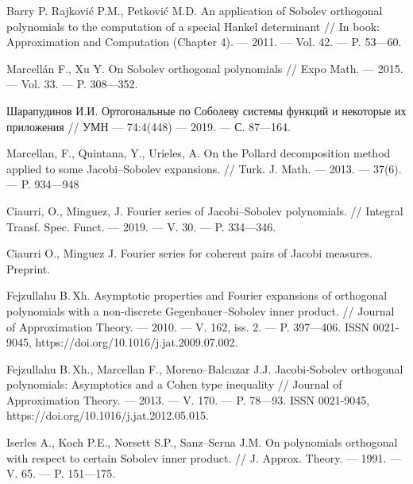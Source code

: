 ﻿\begin{thebibliography}{99}
{Barry P. Rajkovi\'c P.M., Petkovi\'c M.D.}
An application of Sobolev orthogonal polynomials to the computation of a special Hankel determinant
//
In book: Approximation and Computation (Chapter 4).
--- 2011.
--- Vol. 42.
--- P. 53---60.




{Marcell\'an F., Xu Y.}
On Sobolev orthogonal polynomials
//
Expo Math.
--- 2015.
--- Vol. 33.
--- P. 308---352.




Шарапудинов И.И.
Ортогональные по Соболеву системы функций и некоторые их приложения
//
УМН
--- 74:4(448)
--- 2019.
--- С. 87---164.




Marcellan, F., Quintana, Y., Urieles, A.
On the Pollard decomposition method applied to some Jacobi--Sobolev expansions.
//
Turk. J. Math.
--- 2013.
--- 37(6).
--- P. 934---948




Ciaurri, O., Minguez, J.
Fourier series of Jacobi--Sobolev polynomials.
//
Integral Transf. Spec. Funct.
--- 2019.
--- V. 30.
--- P. 334---346.




Ciaurri O., Minguez J.
Fourier series for coherent pairs of Jacobi measures. Preprint.




Fejzullahu B.\,Xh.
Asymptotic properties and Fourier expansions of orthogonal polynomials with a non-discrete Gegenbauer--Sobolev inner product.
//
Journal of Approximation Theory.
--- 2010.
--- V. 162, iss. 2.
--- P. 397---406.
ISSN 0021-9045, https://doi.org/10.1016/j.jat.2009.07.002.




Fejzullahu B.\,Xh., Marcellan F., Moreno--Balcazar J.J.
Jacobi-Sobolev orthogonal polynomials: Asymptotics and a Cohen type inequality
//
Journal of Approximation Theory.
--- 2013.
--- V. 170.
--- P. 78---93.
ISSN 0021-9045, https://doi.org/10.1016/j.jat.2012.05.015.




Iserles A., Koch P.E., Norsett S.P., Sanz--Serna J.M.
On polynomials orthogonal with respect to	certain Sobolev inner product.
//
J. Approx. Theory.
--- 1991.
--- V. 65.
--- P. 151---175.





\end{thebibliography}
